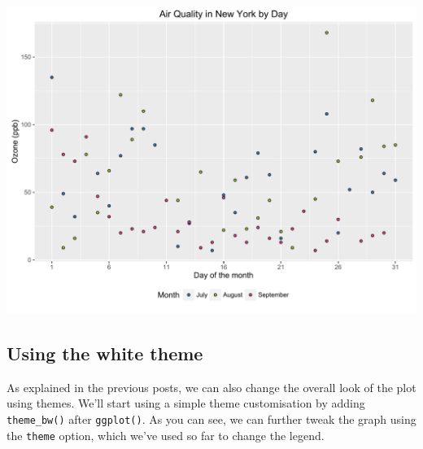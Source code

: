 \documentclass[]{article}
\begin{document}
\begin{center}\includegraphics{0_all_posts_pdf/scatter_11-1} \end{center}

\subsection{Using the white theme}\label{using-the-white-theme-4}

As explained in the previous posts, we can also change the overall look
of the plot using themes. We'll start using a simple theme customisation
by adding \texttt{theme\_bw()} after \texttt{ggplot()}. As you can see,
we can further tweak the graph using the \texttt{theme} option, which
we've used so far to change the legend.
\end{document}
